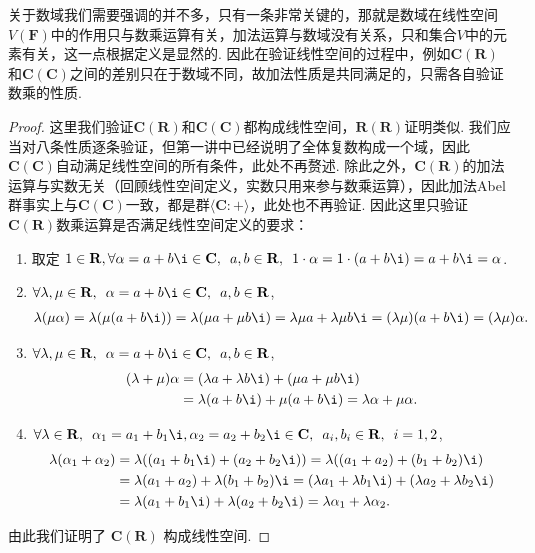 关于数域我们需要强调的并不多，只有一条非常关键的，那就是数域在线性空间$V(\mathbf{F})$中的作用只与数乘运算有关，加法运算与数域没有关系，只和集合$V$中的元素有关，这一点根据定义是显然的. 因此在验证线性空间的过程中，例如$\mathbf{C}(\mathbf{R})$和$\mathbf{C}(\mathbf{C})$之间的差别只在于数域不同，故加法性质是共同满足的，只需各自验证数乘的性质.

\begin{proof}
    这里我们验证$\mathbf{C}(\mathbf{R})$和$\mathbf{C}(\mathbf{C})$都构成线性空间，$\mathbf{R(R)}$证明类似. 我们应当对八条性质逐条验证，但第一讲中已经说明了全体复数构成一个域，因此$\mathbf{C}(\mathbf{C})$自动满足线性空间的所有条件，此处不再赘述. 除此之外，$\mathbf{C}(\mathbf{R})$的加法运算与实数无关（回顾线性空间定义，实数只用来参与数乘运算），因此加法Abel群事实上与$\mathbf{C}(\mathbf{C})$一致，都是群$\langle \mathbf{C}\colon+\rangle$，此处也不再验证. 因此这里只验证$\mathbf{C}(\mathbf{R})$数乘运算是否满足线性空间定义的要求：
    \begin{enumerate}
        \item 取定 $1 \in \mathbf{R}, \forall \alpha = a+b\i \in \mathbf{C},\enspace a, b \in \mathbf{R},\enspace 1 \cdot \alpha = 1 \cdot (a+b\i) = a+b\i = \alpha$.

        \item $\forall \lambda, \mu \in \mathbf{R},\enspace \alpha = a+b\i \in \mathbf{C},\enspace a, b \in \mathbf{R}$,
              \begin{align*}
                  \lambda(\mu \alpha) = \lambda(\mu (a+b\i)) = \lambda(\mu a+\mu b\i) = \lambda \mu a + \lambda \mu b\i = (\lambda \mu)(a+b\i) = (\lambda \mu)\alpha.
              \end{align*}

        \item $\forall \lambda, \mu \in \mathbf{R},\enspace \alpha = a+b\i \in \mathbf{C},\enspace a, b \in \mathbf{R}$,
              \begin{align*}
                  (\lambda + \mu) \alpha
                   & = (\lambda a + \lambda b\i) + (\mu a + \mu b\i)            \\
                   & = \lambda(a+b\i)+\mu(a+b\i) = \lambda \alpha + \mu \alpha.
              \end{align*}

        \item $\forall \lambda \in \mathbf{R},\enspace \alpha_1 = a_1+b_1\i, \alpha_2 = a_2+b_2\i \in \mathbf{C},\enspace a_i, b_i \in \mathbf{R},\enspace i = 1, 2$,
              \begin{align*}
                  \lambda(\alpha_1+\alpha_2)
                   & = \lambda((a_1+b_1\i)+(a_2+b_2\i)) = \lambda((a_1+a_2)+(b_1+b_2)\i)                             \\
                   & = \lambda(a_1+a_2)+\lambda(b_1+b_2)\i = (\lambda a_1+\lambda b_1\i)+(\lambda a_2+\lambda b_2\i) \\
                   & = \lambda(a_1+b_1\i)+\lambda(a_2+b_2\i) = \lambda \alpha_1 + \lambda \alpha_2.
              \end{align*}
    \end{enumerate}
    由此我们证明了 $\mathbf{C}(\mathbf{R})$ 构成线性空间.


\end{proof}
